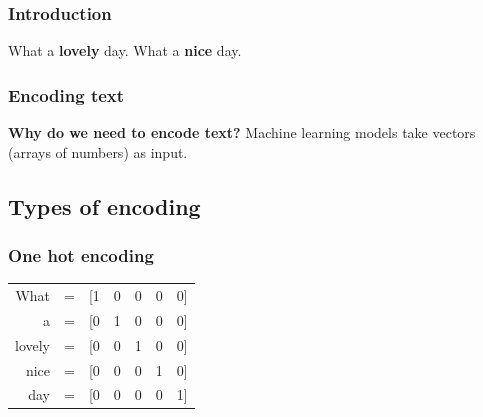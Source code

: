 \begin{frame}
\frametitle{Introduction}


\huge {What a \textbf{lovely} day.}
\newline
\huge{What a \textbf{nice} day.}

\end{frame}


\begin{frame}
\frametitle{Encoding text}


	\huge \textbf{Why do we need to encode text?}
	\newline 
	\newline 
	\normalsize{Machine learning models take vectors (arrays of numbers) as input.}

\end{frame}



\subsection{Types of encoding}


\begin{frame}
	\frametitle{One hot encoding}
	
\begin{table}[h]
	\hspace{15mm}
	\huge
	\begin{tabular}{rcccccc}
		What & = & [1 & 0 & 0 & 0 & 0] \\
		a & = & [0 &  1 &  0 &  0 & 0] \\
		lovely & = & [0 & 0& 1& 0& 0] \\
		nice & = & [0 &0& 0& 1& 0] \\
		day & = & [0 &0& 0& 0& 1] \\
	\end{tabular}
\end{table}


\end{frame}

